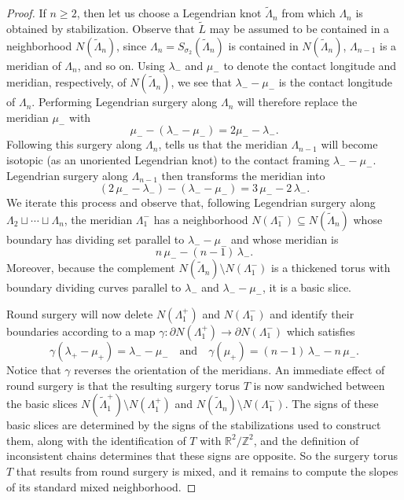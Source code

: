 \documentclass[11pt]{amsart}
\numberwithin{equation}{section}
\theoremstyle{plain}
\theoremstyle{definition}
\theoremstyle{remark}\newtheorem{rem}[equation]{Remark}%
\theoremstyle{remark}\newtheorem{obs}[equation]{Observation}%
\begin{document}
\begin{proof}
If $n\geq 2$, then let us choose a Legendrian knot $\tilde{\Lambda}_n$ from which $\Lambda_n$ is obtained by stabilization.  Observe that $\tilde{L}$ may be assumed to be contained in a neighborhood $N(\tilde{\Lambda}_n)$, since $\Lambda_n=S_{\sigma_2}(\tilde{\Lambda}_n)$ is contained in $N(\tilde{\Lambda}_n)$, $\Lambda_{n-1}$ is a meridian of $\Lambda_n$, and so on.  Using $\lambda_-$ and $\mu_-$ to denote the contact longitude and meridian, respectively, of $N(\tilde{\Lambda}_n)$, we see that $\lambda_--\mu_-$ is the contact longitude of $\Lambda_n$.  Performing Legendrian surgery along $\Lambda_n$ will therefore replace the meridian $\mu_-$ with
\[
\mu_--(\lambda_--\mu_-) = 2\mu_--\lambda_-.
\]
Following this surgery along $\Lambda_n$, \cite[Proposition 2]{ding2009handle} tells us that the meridian $\Lambda_{n-1}$ will become isotopic (as an unoriented Legendrian knot) to the contact framing $\lambda_--\mu_-$.  Legendrian surgery along $\Lambda_{n-1}$ then transforms the meridian into
\[
(2\,\mu_--\lambda_-) - (\lambda_--\mu_-) = 3\,\mu_- - 2\,\lambda_-.
\]
We iterate this process and observe that, following Legendrian surgery along $\Lambda_2\sqcup\cdots\sqcup\Lambda_n$, the meridian $\Lambda_1^-$ has a neighborhood $N(\Lambda_1^-)\subseteq N(\tilde{\Lambda}_n)$ whose boundary has dividing set parallel to $\lambda_--\mu_-$ and whose meridian is
\[
n\,\mu_- - (n-1)\,\lambda_-.
\]
Moreover, because the complement $N(\tilde{\Lambda}_n)\setminus N(\Lambda_1^-)$ is a thickened torus with boundary dividing curves parallel to $\lambda_-$ and $\lambda_--\mu_-$, it is a basic slice.

Round surgery will now delete $N(\Lambda_1^+)$ and $N(\Lambda_1^-)$ and identify their boundaries according to a map $\gamma\colon\partial N(\Lambda_1^+)\to\partial N(\Lambda_1^-)$ which satisfies
\begin{equation}\label{eq:gluing-map}
\gamma(\lambda_+-\mu_+) = \lambda_- - \mu_-
\quad\text{and}\quad
\gamma(\mu_+) = (n-1)\,\lambda_- - n\,\mu_-.
\end{equation}
Notice that $\gamma$ reverses the orientation of the meridians.  An immediate effect of round surgery is that the resulting surgery torus $T$ is now sandwiched between the basic slices $N(\tilde{\Lambda}_1^+)\setminus N(\Lambda_1^+)$ and $N(\tilde{\Lambda}_n)\setminus N(\Lambda_1^-)$.  The signs of these basic slices are determined by the signs of the stabilizations used to construct them, along with the identification of $T$ with $\mathbb{R}^2/\mathbb{Z}^2$, and the definition of inconsistent chains determines that these signs are opposite.  So the surgery torus $T$ that results from round surgery is mixed, and it remains to compute the slopes of its standard mixed neighborhood.


\end{proof}
\end{document}

